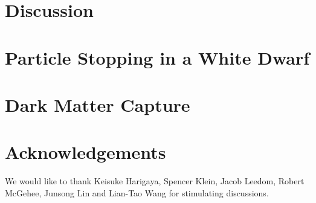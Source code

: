 \documentclass[preprintnumbers,amsmath,amssymb,prd,superscriptaddress]{revtex4}
\begin{document}
\section{Discussion}
\label{sec:discussion}


\begin{appendices}
\section{Particle Stopping in a White Dwarf}
\label{sec:wdpdg}

\section{Dark Matter Capture}
\label{sec:capture}

\end{appendices}

\section*{Acknowledgements}
We would like to thank Keisuke Harigaya, Spencer Klein, Jacob Leedom, Robert McGehee, Junsong Lin and Lian-Tao Wang for stimulating discussions.

\begin{thebibliography}{99}


\end{thebibliography}
\end{document}
